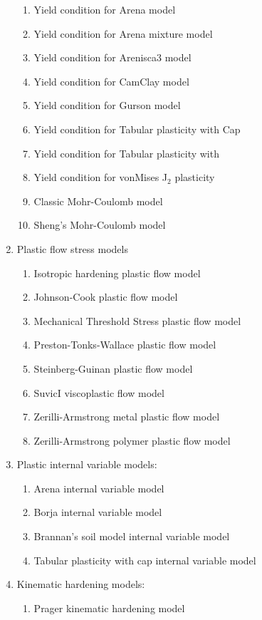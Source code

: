 \begin{enumerate}
\begin{enumerate}
    \item Yield condition for Arena model
    \item Yield condition for Arena mixture model
    \item Yield condition for Arenisca3 model
    \item Yield condition for CamClay model
    \item Yield condition for Gurson model
    \item Yield condition for Tabular plasticity with Cap
    \item Yield condition for Tabular plasticity with
    \item Yield condition for vonMises J$_2$ plasticity
    \item Classic Mohr-Coulomb model
    \item Sheng's Mohr-Coulomb model
  \end{enumerate}
  \item Plastic flow stress models 
  \begin{enumerate}
    \item Isotropic hardening plastic flow model
    \item Johnson-Cook plastic flow model
    \item Mechanical Threshold Stress plastic flow model
    \item Preston-Tonks-Wallace plastic flow model
    \item Steinberg-Guinan plastic flow model
    \item SuvicI viscoplastic flow model
    \item Zerilli-Armstrong metal plastic flow model
    \item Zerilli-Armstrong polymer plastic flow model
  \end{enumerate}
  \item Plastic internal variable models:
  \begin{enumerate}
    \item Arena internal variable model
    \item Borja internal variable model
    \item Brannan's soil model internal variable model
    \item Tabular plasticity with cap internal variable model
  \end{enumerate}
  \item Kinematic hardening models:
  \begin{enumerate}
    \item Prager kinematic hardening model

\end{enumerate}
\end{enumerate}
